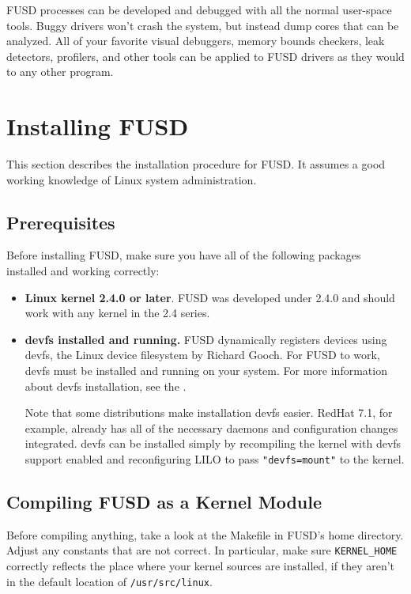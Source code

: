 \documentclass{article}
\begin{document}
FUSD processes can be developed and debugged with all the normal
user-space tools.  Buggy drivers won't crash the system, but instead
dump cores that can be analyzed.  All of your favorite visual
debuggers, memory bounds checkers, leak detectors, profilers, and
other tools can be applied to FUSD drivers as they would to any other
program.

\section{Installing FUSD}

This section describes the installation procedure for FUSD.  It
assumes a good working knowledge of Linux system administration.


\subsection{Prerequisites}

Before installing FUSD, make sure you have all of the following
packages installed and working correctly:

\begin{itemize}
\item {\bf Linux kernel 2.4.0 or later}.  FUSD was developed under
2.4.0 and should work with any kernel in the 2.4 series.

\item {\bf devfs installed and running.}  FUSD dynamically registers
devices using devfs, the Linux device filesystem by Richard Gooch.
For FUSD to work, devfs must be installed and running on your system.
For more information about devfs installation, see the
.

Note that some distributions make installation devfs easier.  RedHat
7.1, for example, already has all of the necessary daemons and
configuration changes integrated.  devfs can be installed simply by
recompiling the kernel with devfs support enabled and reconfiguring
LILO to pass {\tt "devfs=mount"} to the kernel.
\end{itemize}


\subsection{Compiling FUSD as a Kernel Module}

Before compiling anything, take a look at the Makefile in FUSD's home
directory.  Adjust any constants that are not correct.  In particular,
make sure {\tt KERNEL\_HOME} correctly reflects the place where your
kernel sources are installed, if they aren't in the default location
of {\tt /usr/src/linux}.
\end{document}
